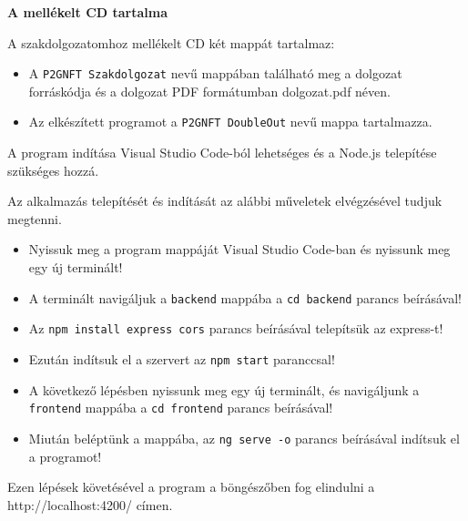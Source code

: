 \pagestyle{empty}

\noindent \textbf{\Large A mellékelt CD tartalma}

\vskip 1cm

A szakdolgozatomhoz mellékelt CD két mappát tartalmaz:

\begin{itemize}
\item A \texttt{P2GNFT Szakdolgozat} nevű mappában található meg a dolgozat forráskódja és a dolgozat PDF formátumban dolgozat.pdf néven.
\item Az elkészített programot a \texttt{P2GNFT DoubleOut} nevű mappa tartalmazza.
\end{itemize}

A program indítása Visual Studio Code-ból lehetséges és a Node.js telepítése szükséges hozzá. 

Az alkalmazás telepítését és indítását az alábbi műveletek elvégzésével tudjuk megtenni.

\begin{itemize}
\item Nyissuk meg a program mappáját Visual Studio Code-ban és nyissunk meg egy új terminált!
\item A terminált navigáljuk a \texttt{backend} mappába a \texttt{cd backend} parancs beírásával!
\item Az \texttt{npm install express cors} parancs beírásával telepítsük az express-t!
\item Ezután indítsuk el a szervert az \texttt{npm start} paranccsal!
\item A következő lépésben nyissunk meg egy új terminált, és navigáljunk a \texttt{frontend} mappába a \texttt{cd frontend} parancs beírásával!
\item Miután beléptünk a mappába, az \texttt{ng serve -o} parancs beírásával indítsuk el a programot! 
\end{itemize}

Ezen lépések követésével a program a böngészőben fog elindulni a http://localhost:4200/ címen.